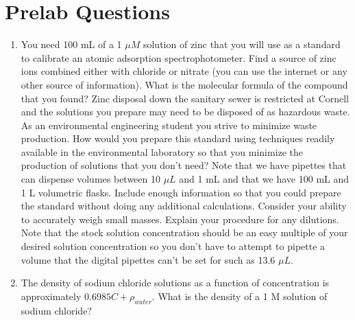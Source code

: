 \documentclass[letterpaper,10pt,english]{sphinxmanual}
\begin{document}
\section{Prelab Questions}
\label{\detokenize{Laboratory_Measurements/Laboratory_Measurements:prelab-questions}}\label{\detokenize{Laboratory_Measurements/Laboratory_Measurements:heading-laboratory-measurements-and-procedures-pre-laboratory-questions}}\begin{enumerate}
\item {} 
You need 100 mL of a 1 \(\mu M\) solution of zinc that you will use as a standard to calibrate an atomic adsorption spectrophotometer. Find a source of zinc ions combined either with chloride or nitrate (you can use the internet or any other source of information). What is the molecular formula of the compound that you found? Zinc disposal down the sanitary sewer is restricted at Cornell and the solutions you prepare may need to be disposed of as hazardous waste. As an environmental engineering student you strive to minimize waste production. How would you prepare this standard using techniques readily available in the environmental laboratory so that you minimize the production of solutions that you don’t need? Note that we have pipettes that can dispense volumes between 10 \(\mu L\) and 1 mL and that we have 100 mL and 1 L volumetric flasks. Include enough information so that you could prepare the standard without doing any additional calculations. Consider your ability to accurately weigh small masses. Explain your procedure for any dilutions. Note that the stock solution concentration should be an easy multiple of your desired solution concentration so you don’t have to attempt to pipette a volume that the digital pipettes can’t be set for such as 13.6 \(\mu L\).

\item {} 
The density of sodium chloride solutions as a function of concentration is approximately \(0.6985C + \rho_{water}\). What is the density of a 1 M solution of sodium chloride?

\end{enumerate}
\end{document}
